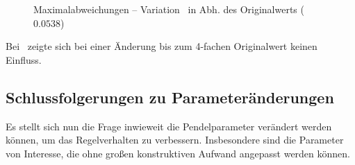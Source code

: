 \begin{figure}[tbp]
	\caption{Maximalabweichungen -- Variation \Mceo\ in Abh. des Originalwerts ($0.0538$)}
	\label{fig:sysvarMc10m}
\end{figure}


Bei \Mczo\ zeigte sich bei einer Änderung bis zum 4-fachen Originalwert keinen Einfluss.


\subsection{Schlussfolgerungen zu Parameteränderungen}

Es stellt sich nun die Frage inwieweit die Pendelparameter verändert werden können, um das Regelverhalten zu verbessern.
Insbesondere sind die Parameter von Interesse, die ohne großen konstruktiven Aufwand angepasst werden können.

